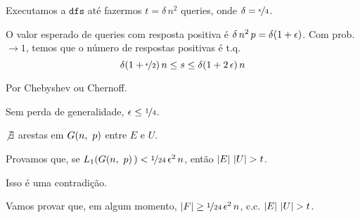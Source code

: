 {Executamos a $\texttt{dfs}$ até fazermos $t=\delta\,n^2$ queries, onde $\delta=\nicefrac{\epsilon}{4}$.

\begin{observacao}
  O valor esperado de queries com resposta positiva é $\delta\,n^2\,p=\delta\l(1+\epsilon\r)$. Com prob. $\rightarrow1$, temos que o número de respostas positivas é t.q.
  \[
    \delta\l(1+\nf{\epsilon}{2}\r)n \leq s \leq \delta\l(1+2\,\epsilon\r)n
  \]
  
  Por Chebyshev ou Chernoff.
  
  Sem perda de generalidade, $\epsilon\leq\nicefrac{1}{4}$.
\end{observacao}

\begin{fato}
  \normalfont
  $\not\exists$ arestas  em $G\l(n,\ p\r)$ entre $E$ e $U$.
\end{fato}

Provamos que, se $L_1\l(G\l(n,\ p\r)\r)<\nf{1}{24}\,\epsilon^2\,n$, então $\l|E\r|\,\l|U\r|>t$.

Isso é uma contradição.

Vamos provar que, em algum momento, $\l|F\r|\geq\nf{1}{24}\,\epsilon^2\,n$, c.c. $\l|E\r|\,\l|U\r|>t$.

}
